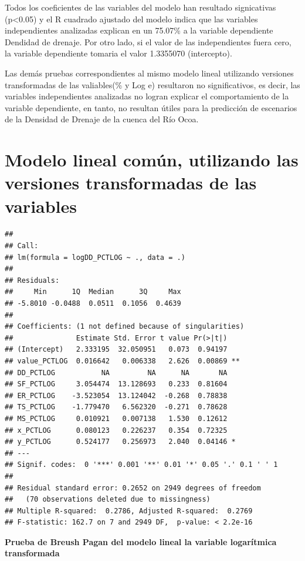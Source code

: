 \documentclass[11pt,]{article}
\begin{document}
Todos los coeficientes de las variables del modelo han resultado
signicativas (p\textless{}0.05) y el R cuadrado ajustado del modelo
indica que las variables independientes analizadas explican en un
75.07\% a la variable dependiente Dendidad de drenaje. Por otro lado, si
el valor de las independientes fuera cero, la variable dependiente
tomaria el valor 1.3355070 (intercepto).

Las demás pruebas correspondientes al mismo modelo lineal utilizando
versiones transformadas de las valiables(\% y Log e) resultaron no
significativos, es decir, las variables independientes analizadas no
logran explicar el comportamiento de la variable dependiente, en tanto,
no resultan útiles para la predicción de escenarios de la Densidad de
Drenaje de la cuenca del Río Ocoa.

\section{Modelo lineal común, utilizando las versiones transformadas de
las
variables}\label{modelo-lineal-comuxfan-utilizando-las-versiones-transformadas-de-las-variables}

\begin{verbatim}
## 
## Call:
## lm(formula = logDD_PCTLOG ~ ., data = .)
## 
## Residuals:
##     Min      1Q  Median      3Q     Max 
## -5.8010 -0.0488  0.0511  0.1056  0.4639 
## 
## Coefficients: (1 not defined because of singularities)
##               Estimate Std. Error t value Pr(>|t|)   
## (Intercept)   2.333195  32.050951   0.073  0.94197   
## value_PCTLOG  0.016642   0.006338   2.626  0.00869 **
## DD_PCTLOG           NA         NA      NA       NA   
## SF_PCTLOG     3.054474  13.128693   0.233  0.81604   
## ER_PCTLOG    -3.523054  13.124042  -0.268  0.78838   
## TS_PCTLOG    -1.779470   6.562320  -0.271  0.78628   
## MS_PCTLOG     0.010921   0.007138   1.530  0.12612   
## x_PCTLOG      0.080123   0.226237   0.354  0.72325   
## y_PCTLOG      0.524177   0.256973   2.040  0.04146 * 
## ---
## Signif. codes:  0 '***' 0.001 '**' 0.01 '*' 0.05 '.' 0.1 ' ' 1
## 
## Residual standard error: 0.2652 on 2949 degrees of freedom
##   (70 observations deleted due to missingness)
## Multiple R-squared:  0.2786, Adjusted R-squared:  0.2769 
## F-statistic: 162.7 on 7 and 2949 DF,  p-value: < 2.2e-16
\end{verbatim}

\textbf{Prueba de Breush Pagan del modelo lineal la variable logarítmica
transformada}
\end{document}
